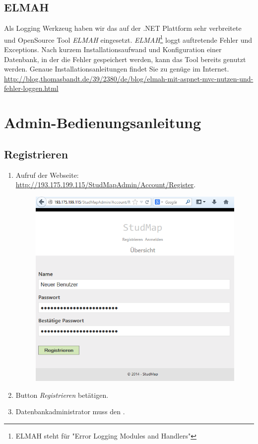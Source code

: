 \subsection*{ELMAH}
Als Logging Werkzeug haben wir das auf der .NET Plattform sehr verbreitete und OpenSource Tool \textit{ELMAH} eingesetzt. \textit{ELMAH}\footnote{ELMAH steht für "Error Logging Modules and Handlers"} loggt auftretende Fehler und Exceptions. Nach kurzem Installationsaufwand und Konfiguration einer Datenbank, in der die Fehler gespeichert werden, kann das Tool bereits genutzt werden. Genaue Installationsanleitungen findet Sie zu genüge im Internet.
\href{URL}{http://blog.thomasbandt.de/39/2380/de/blog/elmah-mit-aspnet-mvc-nutzen-und-fehler-loggen.html} 

\section{Admin-Bedienungsanleitung}
\subsection*{Registrieren}
\begin{enumerate}
\item Aufruf der Webseite: \href{URL}{http://193.175.199.115/StudMapAdmin/Account/Register}.
		\begin{figure}[H]
		\centering
		\includegraphics[width=0.7\linewidth]{../Bilder/Admin/AnleitungRegistratur1}
		\label{fig:AnleitungRegistratur1}
		\end{figure}
\item Button \textit{Registrieren} betätigen.
\item Datenbankadministrator muss den .
\end{enumerate}

